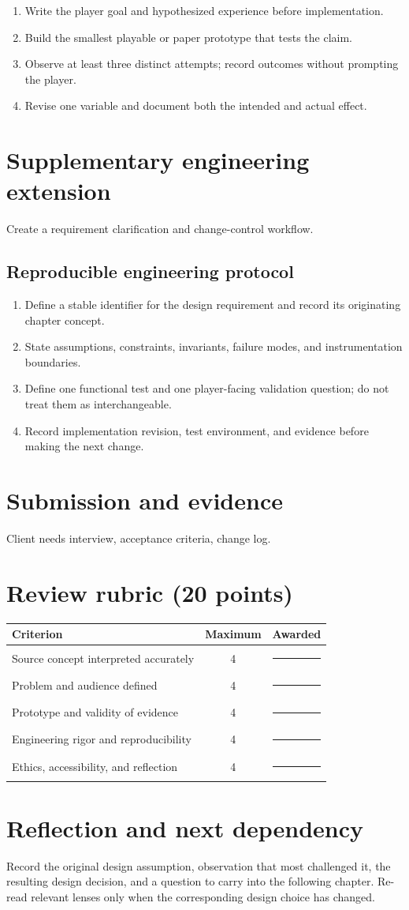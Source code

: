 \documentclass[11pt]{article}
\begin{document}
\begin{enumerate}
\item Write the player goal and hypothesized experience before implementation.
\item Build the smallest playable or paper prototype that tests the claim.
\item Observe at least three distinct attempts; record outcomes without prompting the player.
\item Revise one variable and document both the intended and actual effect.
\end{enumerate}

\section{Supplementary engineering extension}
Create a requirement clarification and change-control workflow.


\subsection{Reproducible engineering protocol}
\begin{enumerate}
\item Define a stable identifier for the design requirement and record its originating chapter concept.
\item State assumptions, constraints, invariants, failure modes, and instrumentation boundaries.
\item Define one functional test and one player-facing validation question; do not treat them as interchangeable.
\item Record implementation revision, test environment, and evidence before making the next change.
\end{enumerate}

\section{Submission and evidence}
Client needs interview, acceptance criteria, change log.


\section{Review rubric (20 points)}
\begin{tabularx}{\linewidth}{@{}Xcc@{}}\toprule
Criterion & Maximum & Awarded \\ \midrule
Source concept interpreted accurately & 4 & \rule{0.45in}{0.4pt}\\
Problem and audience defined & 4 & \rule{0.45in}{0.4pt}\\
Prototype and validity of evidence & 4 & \rule{0.45in}{0.4pt}\\
Engineering rigor and reproducibility & 4 & \rule{0.45in}{0.4pt}\\
Ethics, accessibility, and reflection & 4 & \rule{0.45in}{0.4pt}\\\bottomrule
\end{tabularx}

\section{Reflection and next dependency}
Record the original design assumption, observation that most challenged it, the resulting design decision, and a question to carry into the following chapter. Re-read relevant lenses only when the corresponding design choice has changed.
\end{document}
